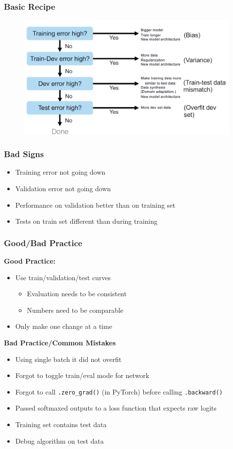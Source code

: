 \documentclass[10pt,a4paper]{article}
\begin{document}
\subsubsection{Basic Recipe}
\begin{figure}[H]
	\includegraphics[width=0.7\columnwidth]{figures/recipe.png}
\end{figure}

\subsubsection{Bad Signs}
\begin{itemize}
	\item Training error not going down
	\item Validation error not going down
	\item Performance on validation better than on training set
	\item Tests on train set different than during training
\end{itemize}

\subsubsection{Good/Bad Practice}
\textbf{Good Practice:}
\begin{itemize}
	\item Use train/validation/test curves
	\begin{itemize}
		\item Evaluation needs to be consistent
		\item Numbers need to be comparable
	\end{itemize}
	\item Only make one change at a time
\end{itemize}

\textbf{Bad Practice/Common Mistakes}
\begin{itemize}
	\item Using single batch it did not overfit
	\item Forgot to toggle train/eval mode for network
	\item Forgot to call \lstinline|.zero_grad()| (in PyTorch) before calling \lstinline|.backward()|
	\item Passed softmaxed outputs to a loss function that expects raw logits
	\item Training set contains test data
	\item Debug algorithm on test data
\end{itemize}
\end{document}
